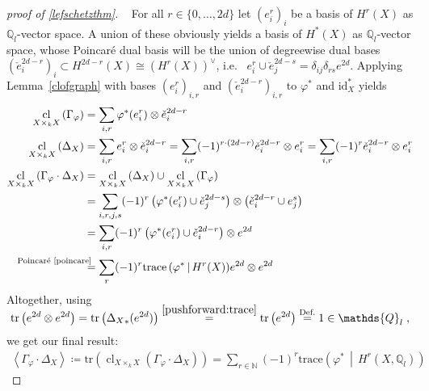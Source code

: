 \documentclass[english]{scrartcl}
\theoremstyle{definition}
\theoremstyle{remark}
\newcommand*{\N}{\mathds{N}}
\newcommand*{\Z}{\mathds{Z}}
\newcommand*{\Q}{\mathds{Q}}
\newcommand*{\Zl}{\Z_l} %
\newcommand*{\Ql}{\Q_l} %
\newcommand*{\id}{\text{id}} %
\newcommand*{\idest}{i.e.\ }
\newcommand*{\Tr}{\text{tr}} %
\newcommand*{\tr}[1]{\Tr\left(#1\right)} %
\newcommand*{\intProd}[2]{{#1\cdot#2}} %
\newcommand*{\intNum}[1]{{\left\langle{#1}\right\rangle}} %
\newcommand*{\Graph}[1]{{\Gamma_{#1}}} %
\newcommand*{\Diag}[1]{{\Delta_{#1}}} %
\newcommand*{\trace}[2]{{\text{trace}\left(#1 \,\middle|\, #2 \right)}} %
\DeclareMathOperator{\CL}{cl} %
\newcommand*{\cl}[2]{{\CL_{#1}\left(#2\right)}} %
\renewcommand*{\phi}{\varphi}
\newcommand*{\Poincare}{{\text{Poincaré \ref{poincare}}}}
\newcommand*{\dual}[1]{\check{#1}} %
\begin{document}
    \begin{proof}[proof of \autoref{lefschetzthm}]~
    For all $r\in\{0,\dotsc,2d\}$ let $(e_i^r)_{i}$ be a basis of
    $H^r(X)$ as $\Ql$-vector space. A union of these obviously yields
    a basis of $H^*(X)$ as $\Ql$-vector space, whose Poincaré dual
    basis will be the union of degreewise dual bases
    $(\dual e_i^{2d-r})_{i}\subset H^{2d-r}(X)\cong (H^{r}(X))^\vee$,
    \idest
    $e^r_i\cup \dual e_j^{2d-s}=\delta_{ij}\delta_{rs}e^{2d}$.
    Applying Lemma~\ref{clofgraph} with bases $(e_i^r)_{i,r}$ and
    $(\dual e_i^{2d-r})_{i,r}$ to $\phi^*$ and $\id_X^*$ yields
    \begin{align*}
      \cl{X\times_k X}{\Graph{\phi}}
      &= \sum_{i,r} \phi^*(e_i^r)\otimes \dual e_i^{2d-r}\\
      \cl{X\times_k X}{\Diag{X}}
      &= \sum_{i,r} e_i^r\otimes \dual e_i^{2d-r} =
        \sum_{i,r} (-1)^{r\cdot (2d-r)}\dual e_i^{2d-r}\otimes e_i^{r} =
        \sum_{i,r} (-1)^{r}\dual e_i^{2d-r}\otimes e_i^r\\
      \cl{X\times_k X}{\intProd{\Graph{\phi}}{\Diag{X}}}
      &= \cl{X\times_k X}{\Diag{X}} \cup \cl{X\times_k X}{\Graph{\phi}}\\
      &= \sum_{i,r,j,s} (-1)^{r}
        \left(\phi^*(e_i^r)\cup \dual e_j^{2d-s}\right)
        \otimes \left(\dual e_i^{2d-r}\cup e_j^s\right)\\
      &= \sum_{i,r} (-1)^{r}
        \left(\phi^*(e_i^r)\cup \dual e_i^{2d-r}\right)
        \otimes e^{2d}\\
      &\overset{\mathllap{\Poincare}}=
        \sum_{r} (-1)^r \trace{\phi^*}{H^r(X)} e^{2d} \otimes e^{2d}
    \end{align*}
    Altogether, using
    \begin{align*}
      \SwapAboveDisplaySkip
      \tr{e^{2d} \otimes e^{2d}}
      = \tr{\Diag{X}_*(e^{2d})}
      \overset{\ref{pushforward:trace}}= \tr{e^{2d}}
      \overset{\text{Def.}}= 1\in\Ql
      \;,
    \end{align*}
    we get our final result:
    \begin{gather*}
      \intNum{\intProd{\Graph\phi}{\Diag X}} \coloneqq
      \tr{\cl{X\times_kX}{\intProd{\Graph\phi}{\Diag X}}}
      = \sum_{r\in\N} (-1)^r \trace{\phi^*}{H^r(X,\Ql)}
    \end{gather*}
\end{proof}

\nocite{*}
\printbibliography
\end{document}
